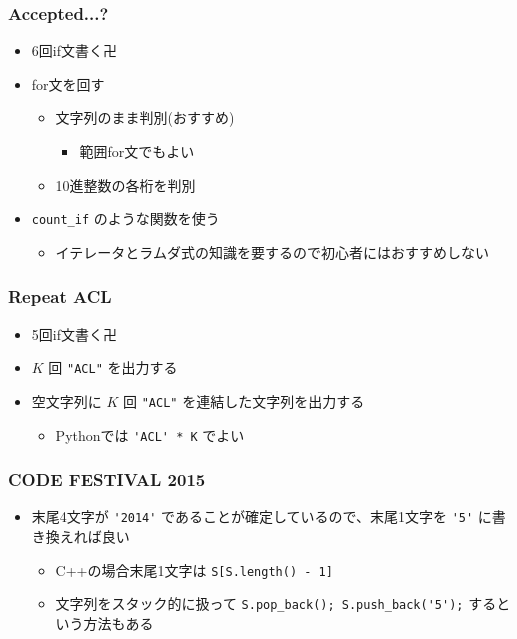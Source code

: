 \documentclass[t, aspectratio=169, dvipdfmx]{beamer}
\begin{document}
\begin{frame}[c]
\end{frame}

\begin{frame}[containsverbatim]
  \frametitle{Accepted...?}
  \begin{itemize}
    \item 6回if文書く卍
    \item for文を回す
    \begin{itemize}
      \item 文字列のまま判別(おすすめ)
      \begin{itemize}
        \item 範囲for文でもよい
      \end{itemize}
      \item 10進整数の各桁を判別
    \end{itemize}
    \item \verb|count_if| のような関数を使う
    \begin{itemize}
      \item イテレータとラムダ式の知識を要するので初心者にはおすすめしない
    \end{itemize}
  \end{itemize}
\end{frame}

\begin{frame}[containsverbatim]
  \frametitle{Repeat ACL}
  \begin{itemize}
    \item 5回if文書く卍
    \item $K$ 回 \verb|"ACL"| を出力する
    \item 空文字列に $K$ 回 \verb|"ACL"| を連結した文字列を出力する
    \begin{itemize}
      \item Pythonでは \verb|'ACL' * K| でよい
    \end{itemize}
  \end{itemize}
\end{frame}

\begin{frame}[containsverbatim]
  \frametitle{CODE FESTIVAL 2015}
  \begin{itemize}
    \item 末尾4文字が \verb|'2014'| であることが確定しているので、末尾1文字を \verb|'5'| に書き換えれば良い
    \begin{itemize}
      \item C++の場合末尾1文字は \verb|S[S.length() - 1]|
      \item 文字列をスタック的に扱って \verb|S.pop_back(); S.push_back('5');| するという方法もある
    \end{itemize}
  \end{itemize}
\end{frame}
\end{document}
